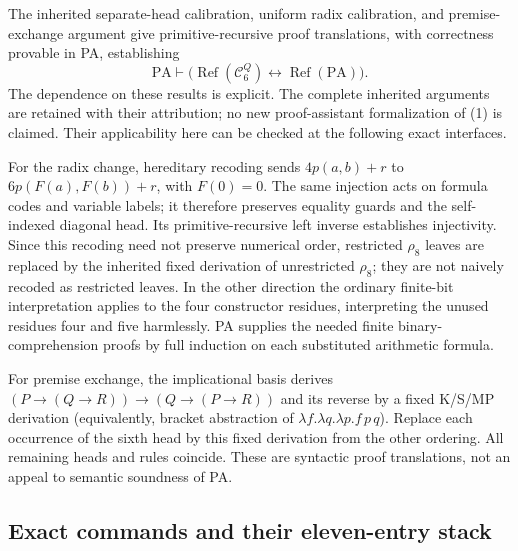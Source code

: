The inherited separate-head calibration, uniform radix calibration, and
premise-exchange argument give primitive-recursive proof translations,
with correctness provable in PA, establishing
\[
 \mathrm{PA}\vdash
 \bigl(\operatorname{Ref}(\mathcal C_6^Q)
                   \leftrightarrow\operatorname{Ref}(\mathrm{PA})\bigr).
 \tag{1}
\]
The dependence on these results is explicit. The complete inherited
arguments are retained with their attribution; no new proof-assistant
formalization of (1) is claimed. Their applicability here can be checked
at the following exact interfaces.

For the radix change, hereditary recoding sends
$4p(a,b)+r$ to $6p(F(a),F(b))+r$, with $F(0)=0$. The same injection acts
on formula codes and variable labels; it therefore preserves equality
guards and the self-indexed diagonal head. Its primitive-recursive left
inverse establishes injectivity. Since this recoding need not preserve
numerical order, restricted $\rho_8$ leaves are replaced by the inherited
fixed derivation of unrestricted $\rho_8$; they are not naively recoded
as restricted leaves. In the other direction the ordinary finite-bit
interpretation applies to the four constructor residues, interpreting the
unused residues four and five harmlessly. PA supplies the needed finite
binary-comprehension proofs by full induction on each substituted
arithmetic formula.

For premise exchange, the implicational basis derives
$(P\to(Q\to R))\to(Q\to(P\to R))$ and its reverse by a fixed
K/S/MP derivation (equivalently, bracket abstraction of
$\lambda f.\lambda q.\lambda p.f\,p\,q$). Replace each occurrence
of the sixth head by this fixed derivation from the other ordering.
All remaining heads and rules coincide. These are syntactic proof
translations, not an appeal to semantic soundness of PA.

\subsection{Exact commands and their eleven-entry stack}

